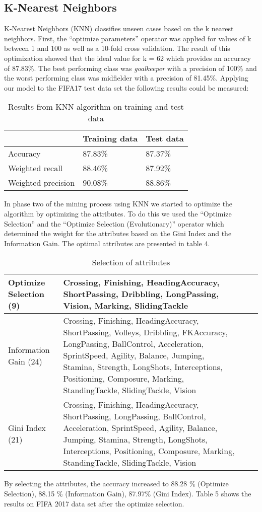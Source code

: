 \subsection{K-Nearest Neighbors}
\label{sec:KNN}
K-Nearest Neighbors (KNN) classifies unseen cases based on the k nearest neighbors. 
First, the ``optimize parameters'' operator was applied for values of k between 1 and 100 as well as a 10-fold cross validation. The result of this optimization showed that the ideal value for k = 62 which provides an accuracy of 87.83\%. The best performing class was \textit{goalkeeper} with a precision of 100\% and the worst performing class was midfielder with a precision of 81.45\%. 
Applying our model to the FIFA17 test data set the following results could be measured:
\begin{table}[h]
\label{Tab:knn}
\centering
\begin{tabular}{@{}lll@{}}
\toprule
                   & Training data & Test data \\ \midrule
Accuracy           & 87.83\%       & 87.37\%   \\
Weighted recall    & 88.46\%       & 87.92\%   \\
Weighted precision & 90.08\%       & 88.86\%   \\ \bottomrule
\end{tabular}
\caption{Results from KNN algorithm on training and test data}
\end{table}
In phase two of the mining process using KNN we started to optimize the algorithm by optimizing the attributes.
To do this we used the ``Optimize Selection'' and the ``Optimize Selection (Evolutionary)'' operator which determined the weight for the attributes based on the Gini Index and the Information Gain.
The optimal attributes are presented in table 4.
\begin{table}[H]
\begin{tabular}{p{3.5cm}|p{7.5cm}l|l}
\hline 
Optimize Selection (9) & Crossing, Finishing, HeadingAccuracy, ShortPassing, Dribbling, LongPassing, Vision, Marking, SlidingTackle\\
\hline
Information Gain (24)& Crossing, Finishing, HeadingAccuracy, ShortPassing, Volleys, Dribbling, FKAccuracy, LongPassing, BallControl, Acceleration, SprintSpeed, Agility, Balance, Jumping, Stamina, Strength, LongShots, Interceptions, Positioning, Composure, Marking, StandingTackle, SlidingTackle, Vision \\
\hline 
Gini Index (21) & Crossing, Finishing, HeadingAccuracy, ShortPassing, LongPassing, BallControl, Acceleration, SprintSpeed, Agility, Balance, Jumping, Stamina, Strength, LongShots, Interceptions, Positioning, Composure, Marking, StandingTackle, SlidingTackle, Vision\\ \hline
\end{tabular}
\label{Tab:knn2}
\caption{Selection of attributes}
\end{table}	
By selecting the attributes, the accuracy increased to 88.28 \% (Optimize Selection), 88.15 \% (Information Gain), 87.97\% (Gini Index). Table 5 shows the results on FIFA 2017 data set after the optimize selection.

